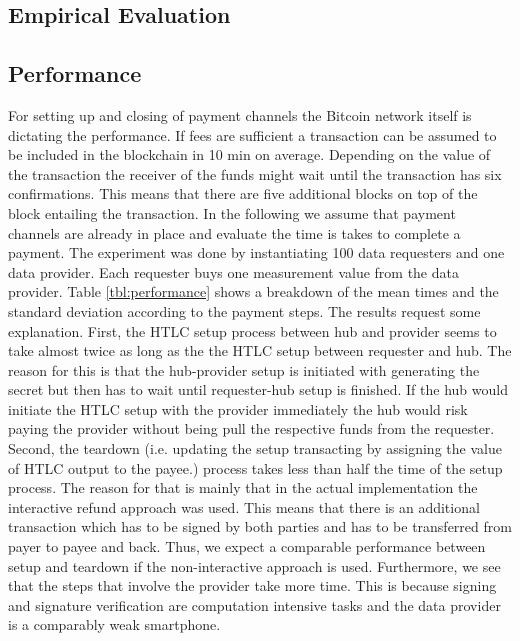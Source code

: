 \documentclass[10pt,journal,compsoc]{IEEEtran}
\begin{document}
\subsection{Empirical Evaluation}

\subsection{Performance}

For setting up and closing of payment channels the Bitcoin network itself is dictating the performance. If fees are sufficient a transaction can be assumed to be included in the blockchain in 10 min on average. Depending on the value of the transaction the receiver of the funds might wait until the transaction has six confirmations. This means that there are five additional blocks on top of the block entailing the transaction. 
In the following we assume that payment channels are already in place and evaluate the time is takes to complete a payment. The experiment was done by instantiating 100 data requesters and one data provider. Each requester buys one measurement value from the data provider. Table \ref{tbl:performance} shows a breakdown of the mean times and the standard deviation according to the payment steps. The results request some explanation. First, the HTLC setup process between hub and provider seems to take almost twice as long as the the HTLC setup between requester and hub. The reason for this is that the hub-provider setup is initiated with generating the secret but then has to wait until requester-hub setup is finished. If the hub would initiate the HTLC setup with the provider immediately the hub would risk paying the provider without being pull the respective funds from the requester. Second, the teardown (i.e. updating the setup transacting by assigning the value of HTLC output to the payee.) process takes less than half the time of the setup process. The reason for that is mainly that in the actual implementation the interactive refund approach was used. This means that there is an additional transaction which has to be signed by both parties and has to be transferred from payer to payee and back. Thus, we expect a comparable performance between setup and teardown if the non-interactive approach is used. Furthermore, we see that the steps that involve the provider take more time. This is because signing and signature verification are computation intensive tasks and the data provider is a comparably weak smartphone.
\end{document}
